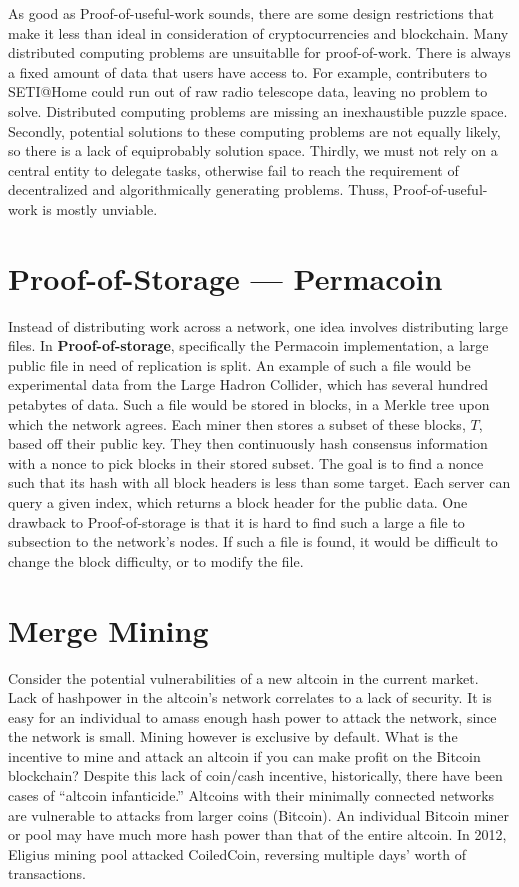 \documentclass[11pt]{article}
\begin{document}
    As good as Proof-of-useful-work sounds, there are some design restrictions that make it less than ideal in consideration of cryptocurrencies and blockchain. Many distributed computing problems are unsuitablle for proof-of-work. There is always a fixed amount of data that users have access to. For example, contributers to SETI@Home could run out of raw radio telescope data, leaving no problem to solve. Distributed computing problems are missing an inexhaustible puzzle space. Secondly, potential solutions to these computing problems are not equally likely, so there is a lack of equiprobably solution space. Thirdly, we must not rely on a central entity to delegate tasks, otherwise fail to reach the requirement of decentralized and algorithmically generating problems. Thuss, Proof-of-useful-work is mostly unviable.
    
    \section*{Proof-of-Storage --- Permacoin}
    
    Instead of distributing work across a network, one idea involves distributing large files. In \textbf{Proof-of-storage}, specifically the Permacoin implementation, a large public file in need of replication is split. An example of such a file would be experimental data from the Large Hadron Collider, which has several hundred petabytes of data. Such a file would be stored in blocks, in a Merkle tree upon which the network agrees. Each miner then stores a subset of these blocks, $T$, based off their public key. They then continuously hash consensus information with a nonce to pick blocks in their stored subset. The goal is to find a nonce such that its hash with all block headers is less than some target. Each server can query a given index, which returns a block header for the public data. One drawback to Proof-of-storage is that it is hard to find such a large a file to subsection to the network's nodes. If such a file is found, it would be difficult to change the block difficulty, or to modify the file.
    
    \section*{Merge Mining}
    
    Consider the potential vulnerabilities of a new altcoin in the current market. Lack of hashpower in the altcoin's network correlates to a lack of security. It is easy for an individual to amass enough hash power to attack the network, since the network is small. Mining however is exclusive by default. What is the incentive to mine and attack an altcoin if you can make profit on the Bitcoin blockchain? Despite this lack of coin/cash incentive, historically, there have been cases of ``altcoin infanticide.'' Altcoins with their minimally connected networks are vulnerable to attacks from larger coins (Bitcoin). An individual Bitcoin miner or pool may have much more hash power than that of the entire altcoin. In 2012, Eligius mining pool attacked CoiledCoin, reversing multiple days' worth of transactions.
    
\end{document}
